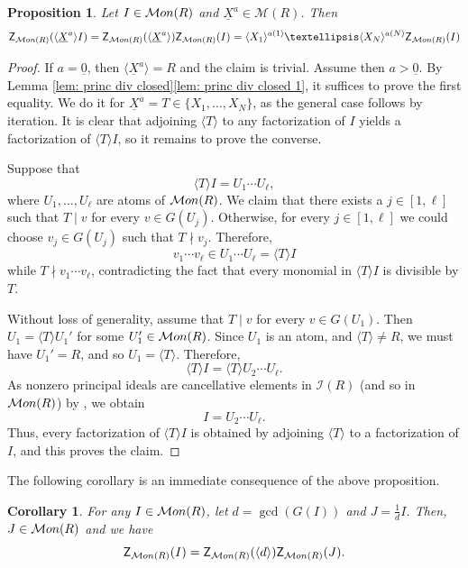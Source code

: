 \documentclass[10pt,a4paper]{amsart}
\newtheorem{proposition}[theorem]{Proposition}
\newtheorem{corollary}[theorem]{Corollary}
\providecommand\Mon{{\mathcal{M}{\rm on}}}
\begin{document}
\begin{proposition}\label{prop: princ factors}
    Let $I\in\Mon(R)$ and $\underline X^a\in \mathcal M(R)$. Then
    \[ \mathsf Z_{\Mon(R)} (\langle \underline X^a\rangle I) = \mathsf Z_{\Mon(R)}(\langle \underline X^a\rangle) \mathsf Z_{\Mon(R)}(I) = \langle X_1\rangle^{a(1)}\dots\langle X_N\rangle^{a(N)} \mathsf Z_{\Mon(R)}(I)\]
\end{proposition}
\begin{proof}
    If $a=\underline 0$, then $\langle \underline X^a\rangle=R$ and the claim is trivial. Assume then $a>\underline 0$. By Lemma \ref{lem: princ div closed}\ref{lem: princ div closed 1}, it suffices to prove the first equality. We do it for $\underline X^a = T\in\{X_1,\dots,X_N\}$, as the general case follows by iteration. It is clear that adjoining $\langle T\rangle$ to any factorization of $I$ yields a factorization of $\langle T\rangle I$, so it remains to prove the converse.

    Suppose that 
    \[\langle T\rangle I = U_1\cdots U_\ell,\]
    where $U_1,\dots,U_\ell$ are atoms of $\Mon(R)$. We claim that there exists a $j \in [1,\ell]$ such that $T\mid v$ for every $v\in G(U_j)$. Otherwise, for every $j\in[1,\ell]$ we could choose $v_j\in G(U_j)$ such that $T\nmid v_j$. Therefore,
    \[v_1\cdots v_\ell\in  U_1\cdots U_\ell=\langle T\rangle I\]
    while $T\nmid v_1\cdots v_\ell$, contradicting the fact that every monomial in $\langle T\rangle I$ is divisible by $T$. 

    Without loss of generality, assume that $T\mid v$ for every $v\in G(U_1)$. Then $U_1=\langle T\rangle U_1'$ for some $U_1'\in\Mon(R)$. Since $U_1$ is an atom, and $\langle T\rangle\ne R$, we must have $U_1'=R$, and so $U_1=\langle T\rangle$. Therefore,
    \[\langle T\rangle I = \langle T\rangle U_2\cdots U_\ell.\]
    As nonzero principal ideals are cancellative elements in $\mathcal I(R)$ (and so in $\Mon(R)$) by \cite{An-Ro97}, we obtain \[I = U_2\cdots U_\ell.\] Thus, every factorization of $\langle T\rangle I$ is obtained by adjoining $\langle T\rangle$ to a factorization of $I$, and this proves the claim.
\end{proof}

The following corollary is an immediate consequence of the above proposition.
\begin{corollary}
    For any $I\in\Mon(R)$, let $d=\gcd{(G(I))}$ and $J=\frac {1}{d} I$. Then, $J\in\Mon(R)$ and we have
    \[ \mathsf Z_{\Mon(R)}(I) = \mathsf Z_{\Mon(R)}(\langle d\rangle) \mathsf Z_{\Mon(R)}(J).  \]
\end{corollary}
\end{document}
